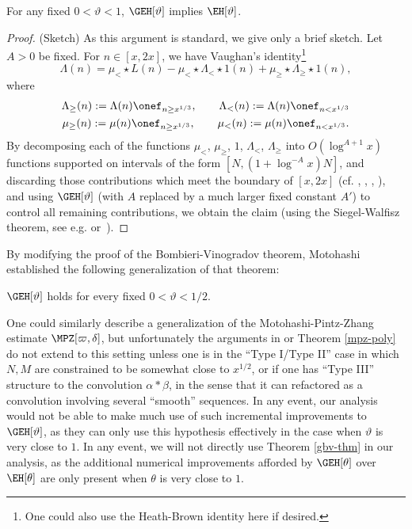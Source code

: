 \begin{proposition}\label{geh-eh}  For any fixed $0 < \vartheta < 1$, $\GEH[\vartheta]$ implies $\EH[\vartheta]$.
\end{proposition}

\begin{proof} (Sketch)  As this argument is standard, we give only a brief sketch.
Let $A > 0$ be fixed.  For $n \in [x,2x]$, we have Vaughan's identity\footnote{One could also use the Heath-Brown identity \cite{hb-ident} here if desired.} \cite{vaughan}
$$ \Lambda(n) = \mu_< \star  L(n) - \mu_< \star  \Lambda_< \star  1(n) + \mu_\geq \star  \Lambda_\geq \star  1(n),$$
where
\begin{gather}
\Lambda_\geq(n) := \Lambda(n) \onef_{n \geq x^{1/3}},\quad\quad 
\Lambda_<(n) := \Lambda(n) \onef_{n < x^{1/3}}\\
\mu_\geq(n) := \mu(n) \onef_{n \geq x^{1/3}},\quad\quad \mu_<(n) := \mu(n)
\onef_{n < x^{1/3}}.
\end{gather}
By decomposing each of the functions $\mu_<$, $\mu_\geq$, $1$, $\Lambda_<$, $\Lambda_{\geq}$ into $O(\log^{A+1} x)$ functions supported on intervals of the form $[N, (1+\log^{-A} x) N]$, and discarding those contributions which meet the boundary of $[x,2x]$ (cf. \cite{fouvry}, \cite{fi-2}, \cite{bfi}, \cite{zhang}), and using $\GEH[\vartheta]$ (with $A$ replaced by a much larger fixed constant $A'$) to control all remaining contributions, we obtain the claim (using the Siegel-Walfisz theorem, see e.g. \cite[Satz 4]{siebert}
  or~\cite[Th. 5.29]{ik}).
\end{proof}

By modifying the proof of the Bombieri-Vinogradov theorem, Motohashi \cite{motohashi} established the following generalization of that theorem:

\begin{theorem}\label{gbv-thm}\cite{motohashi}  $\GEH[\vartheta]$ holds for every fixed $0 < \vartheta < 1/2$.
\end{theorem}

One could similarly describe a generalization of the Motohashi-Pintz-Zhang estimate $\MPZ[\varpi,\delta]$, but unfortunately the arguments in \cite{zhang} or Theorem \ref{mpz-poly} do not extend to this setting unless one is in the ``Type I/Type II'' case in which $N,M$ are constrained to be somewhat close to $x^{1/2}$, or if one has ``Type III'' structure to the convolution $\alpha \ast \beta$, in the sense that it can refactored as a convolution involving several ``smooth'' sequences.  In any event, our analysis would not be able to make much use of such incremental improvements to $\GEH[\vartheta]$, as they can only use this hypothesis effectively in the case when $\vartheta$ is very close to $1$.  In any event, we will not directly use Theorem \ref{gbv-thm} in our analysis, as the additional numerical improvements afforded by $\GEH[\theta]$ over $\EH[\theta]$ are only present when $\theta$ is very close to $1$.



